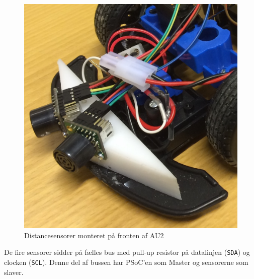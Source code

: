 \begin{figure}[ht]
	\centering
	\includegraphics[scale=0.1]{../fig/billeder/distancesensor_montering.jpg}
	\caption{Distancesensorer monteret på fronten af AU2}
	\label{fig:ds_mont}
\end{figure}

De fire sensorer sidder på fælles \IIC bus med pull-up resistor på datalinjen (\texttt{SDA}) og clocken (\texttt{SCL}). Denne del af bussen har PSoC'en som Master og sensorerne som slaver. 


